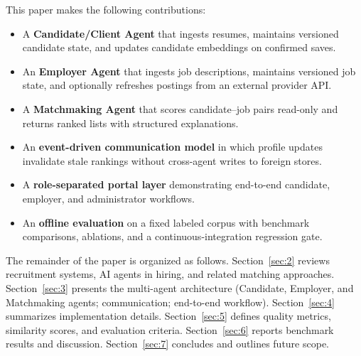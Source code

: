 This paper makes the following contributions:
\begin{itemize}[noitemsep]
  \item A \textbf{Candidate/Client Agent} that ingests resumes, maintains versioned candidate state, and updates candidate embeddings on confirmed saves.
  \item An \textbf{Employer Agent} that ingests job descriptions, maintains versioned job state, and optionally refreshes postings from an external provider API.
  \item A \textbf{Matchmaking Agent} that scores candidate--job pairs read-only and returns ranked lists with structured explanations.
  \item An \textbf{event-driven communication model} in which profile updates invalidate stale rankings without cross-agent writes to foreign stores.
  \item A \textbf{role-separated portal layer} demonstrating end-to-end candidate, employer, and administrator workflows.
  \item An \textbf{offline evaluation} on a fixed labeled corpus with benchmark comparisons, ablations, and a continuous-integration regression gate.
\end{itemize}

The remainder of the paper is organized as follows.
Section~\ref{sec:2} reviews recruitment systems, AI agents in hiring, and related matching approaches.
Section~\ref{sec:3} presents the multi-agent architecture (Candidate, Employer, and Matchmaking agents; communication; end-to-end workflow).
Section~\ref{sec:4} summarizes implementation details.
Section~\ref{sec:5} defines quality metrics, similarity scores, and evaluation criteria.
Section~\ref{sec:6} reports benchmark results and discussion.
Section~\ref{sec:7} concludes and outlines future scope.
